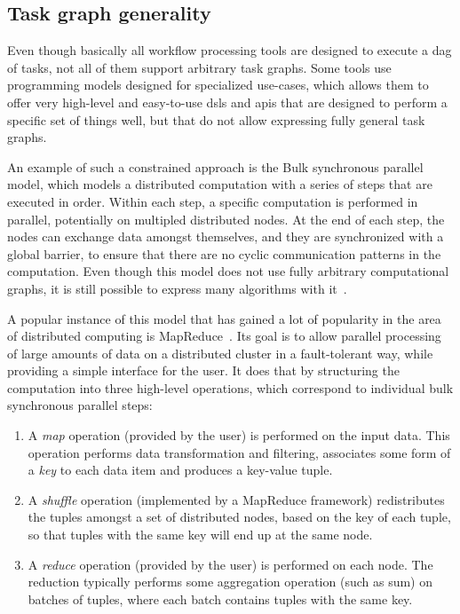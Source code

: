 \subsection{Task graph generality}
Even though basically all workflow processing tools are designed to execute a
\gls{dag} of tasks, not all of them support arbitrary task graphs. Some tools use
programming models designed for specialized use-cases, which allows them to offer very high-level
and easy-to-use \glspl{dsl} and \glspl{api} that are designed to
perform a specific set of things well, but that do not allow expressing fully general task graphs.

An example of such a constrained approach is the Bulk synchronous
parallel~\cite{bulkparallel1} model, which models a distributed computation with a series of
steps that are executed in order. Within each step, a specific computation is performed in
parallel, potentially on multipled distributed nodes. At the end of each step, the nodes can
exchange data amongst themselves, and they are synchronized with a global barrier, to ensure that
there are no cyclic communication patterns in the computation. Even though this model does not use
fully arbitrary computational graphs, it is still possible to express many algorithms with
it~\cite{bulkparallel2}.

A popular instance of this model that has gained a lot of popularity in the area of distributed
computing is MapReduce~\cite{mapreduce}. Its goal is to allow parallel processing of
large amounts of data on a distributed cluster in a fault-tolerant way, while providing a simple
interface for the user. It does that by structuring the computation into three high-level
operations, which correspond to individual bulk synchronous parallel steps:
\begin{enumerate}
	\item A \emph{map} operation (provided by the user) is performed on the input data. This
	      operation performs data transformation and filtering, associates some form of a
	      \emph{key} to each data item and produces a key-value tuple.
	\item A \emph{shuffle} operation (implemented by a MapReduce framework) redistributes the
	      tuples amongst a set of distributed nodes, based on the key of each tuple, so that tuples with the
	      same key will end up at the same node.
	\item A \emph{reduce} operation (provided by the user) is performed on each node. The
	      reduction typically performs some aggregation operation (such as sum) on batches of tuples, where
	      each batch contains tuples with the same key.
\end{enumerate}

